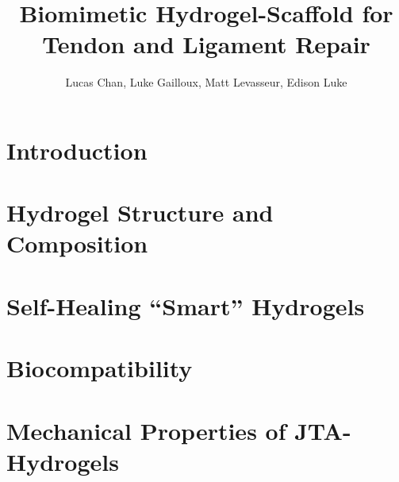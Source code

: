 \documentclass[
    letterpaper,
    10pt,
    unnumberedsections,
    twoside
]{LTJournalArticle}
\title{Biomimetic Hydrogel-Scaffold for Tendon and Ligament Repair}
\author{Lucas Chan, Luke Gailloux, Matt Levasseur, Edison Luke}
\begin{document}
    \maketitle 

    \section{Introduction}

    

    \section{Hydrogel Structure and Composition}

    

    \section{Self-Healing ``Smart'' Hydrogels}
    

    \section{Biocompatibility}

    

    \section{Mechanical Properties of JTA-Hydrogels}

    
\end{document}
